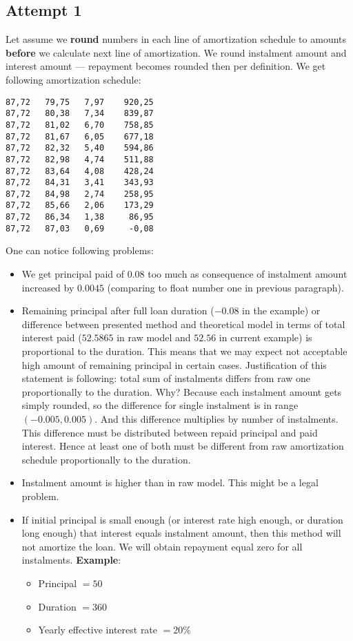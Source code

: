 \documentclass[letterpaper,11pt]{article}
\begin{document}
\subsection {Attempt 1}
Let assume we {\bf round} numbers in each line of amortization schedule to amounts {\bf before} we calculate next line of amortization. We round instalment amount and interest amount --- repayment becomes rounded then per definition. We get following amortization schedule:
\begin{verbatim}
87,72   79,75   7,97    920,25
87,72   80,38   7,34    839,87
87,72   81,02   6,70    758,85
87,72   81,67   6,05    677,18
87,72   82,32   5,40    594,86
87,72   82,98   4,74    511,88
87,72   83,64   4,08    428,24
87,72   84,31   3,41    343,93
87,72   84,98   2,74    258,95
87,72   85,66   2,06    173,29
87,72   86,34   1,38     86,95
87,72   87,03   0,69     -0,08
\end{verbatim}

One can notice following problems:
\begin{itemize}
\item We get principal paid of $0.08$ too much as consequence of instalment amount increased by $0.0045$ (comparing to float number one in previous paragraph).
\item Remaining principal after full loan duration ($-0.08$ in the example) or difference between presented method and theoretical model in terms of total interest paid ($52.5865$ in raw model and $52.56$ in current example) is proportional to the duration. This means that we may expect not acceptable high amount of remaining principal in certain cases.
Justification of this statement is following: total sum of instalments differs from raw one proportionally to the duration. Why? Because each instalment amount gets simply rounded, so the difference for single instalment is in range $(-0.005,0.005)$. And this difference multiplies by number of instalments.
This difference must be distributed between repaid principal and paid interest. Hence at least one of both must be different from raw amortization schedule proportionally to the duration.
\item Instalment amount is higher than in raw model. This might be a legal problem.
\item If initial principal is small enough (or interest rate high enough, or duration long enough) that interest equals instalment amount, then this method will not amortize the loan. We will obtain repayment equal zero for all instalments.
    {\bf Example}:
    \begin{itemize}
    \item Principal $= 50$
    \item Duration $= 360$
    \item Yearly effective interest rate $= 20\%$
    \end{itemize}
\end{itemize}
\end{document}

